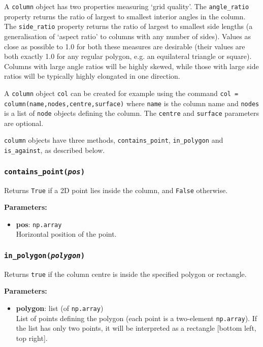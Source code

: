 A \texttt{column} object has two properties measuring `grid quality'.  The \texttt{angle\_ratio} property returns the ratio of largest to smallest interior angles in the column.  The \texttt{side\_ratio} property returns the ratio of largest to smallest side lengths (a generalisation of `aspect ratio' to columns with any number of sides).  Values as close as possible to 1.0 for both these measures are desirable (their values are both exactly 1.0 for any regular polygon, e.g. an equilateral triangle or square).  Columns with large angle ratios will be highly skewed, while those with large side ratios will be typically highly elongated in one direction.

A \texttt{column} object \texttt{col} can be created for example using the command \texttt{col = column(name,nodes,centre,surface)} where \texttt{name} is the column name and \texttt{nodes} is a list of \texttt{node} objects defining the column.  The \texttt{centre} and \texttt{surface} parameters are optional.

\texttt{column} objects have three methods, \texttt{contains\_point}, \texttt{in\_polygon} and \texttt{is\_against}, as described below.

\subsubsection{\texttt{contains\_point(\emph{pos})}}

Returns \texttt{True} if a 2D point lies inside the column, and \texttt{False} otherwise.

\textbf{Parameters:}
\begin{itemize}
\item \textbf{pos}: \texttt{np.array}\\
  Horizontal position of the point.
\end{itemize}

\subsubsection{\texttt{in\_polygon(\emph{polygon})}}

Returns \texttt{true} if the column centre is inside the specified polygon or rectangle.

\textbf{Parameters:}
\begin{itemize}
\item \textbf{polygon}: list (of \texttt{np.array})\\
  List of points defining the polygon (each point is a two-element \texttt{np.array}).  If the list has only two points, it will be interpreted as a rectangle [bottom left, top right].
\end{itemize}

